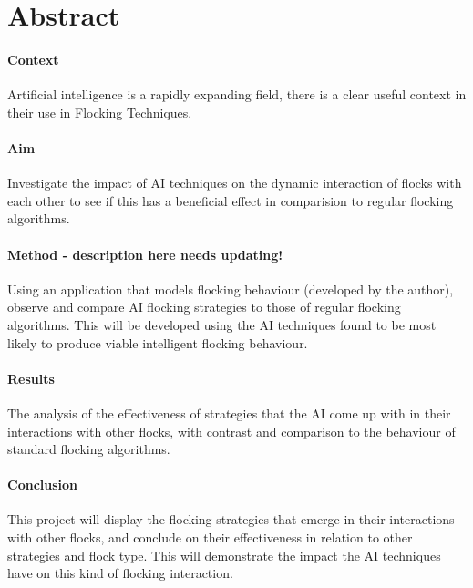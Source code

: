 
\section{Abstract}
	
	\paragraph{Context}
	Artificial intelligence is a rapidly expanding field, there is a clear useful context in their use in Flocking Techniques.
	
	\paragraph{Aim}
	Investigate the impact of AI techniques on the dynamic interaction of flocks with each other to see if this has a 
	beneficial effect in comparision to regular flocking algorithms.
	
	\paragraph{Method - description here needs updating!}
	Using an application that models flocking behaviour (developed by the author), observe and compare AI flocking strategies
	to those of regular flocking algorithms. This will be developed using the AI techniques found to be most likely to produce 
	viable intelligent flocking behaviour.
	
	\paragraph{Results}
	The analysis of the effectiveness of strategies that the AI come up with in their interactions with other flocks, with
	contrast and comparison to the behaviour of standard flocking algorithms.
	
	\paragraph{Conclusion}
	This project will display the flocking strategies that emerge in their interactions with other flocks, and conclude on their
	effectiveness in relation to other strategies and flock type. This will demonstrate the impact the AI techniques have on
	this kind of flocking interaction.
